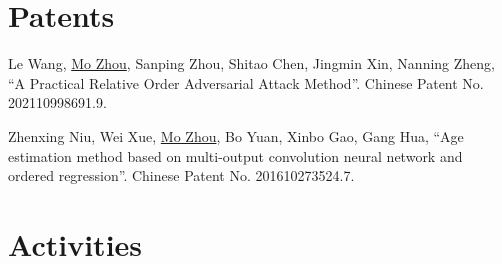 \documentclass[10pt,margin,line,pifont,palatino,courier]{res}
\begin{document}
\begin{resume}
\section{\sc Patents}

\begin{enumerate}[noitemsep, leftmargin=*, label={[P0{\arabic*}]}]

\item Le Wang, \underline{Mo Zhou}, Sanping Zhou, Shitao Chen, Jingmin Xin, Nanning Zheng,
	``A Practical Relative Order Adversarial Attack Method''.
	Chinese Patent No. 202110998691.9.

\item Zhenxing Niu, Wei Xue, \underline{Mo Zhou}, Bo Yuan, Xinbo Gao, Gang Hua,
	``Age estimation method based on multi-output convolution neural
	network and ordered regression''. Chinese Patent No. 201610273524.7.

\end{enumerate}

\section{\sc Activities}


\end{resume}
\end{document}
